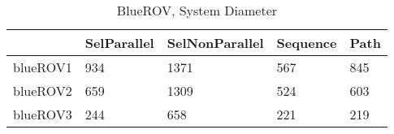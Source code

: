 \begin{table}
\centering
\caption{BlueROV, System Diameter}
\label{ROV_diam}
\begin{tabular}{lllll}
\toprule
{} & SelParallel & SelNonParallel & Sequence & Path \\
\midrule
blueROV1 &         934 &           1371 &      567 &  845 \\
blueROV2 &         659 &           1309 &      524 &  603 \\
blueROV3 &         244 &            658 &      221 &  219 \\
\bottomrule
\end{tabular}
\end{table}

